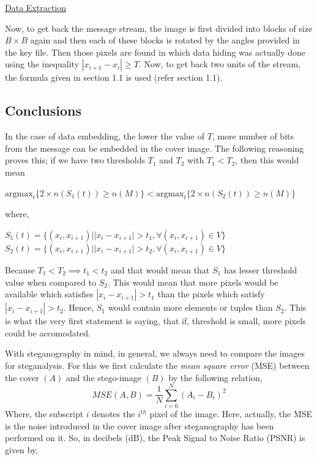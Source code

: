 \documentclass{report}
\begin{document}
\underline{\large Data Extraction} \\
\par Now, to get back the message stream, the image is first divided into blocks of size $B \times B$ again and then each of these blocks is rotated by the angles provided in the key file. Then those pixels are found in which data hiding was actually done using the inequality $|x_{i+1}-x_{i}|\geq T$. Now, to get back two units of the stream, the formula given in section 1.1 is used (refer section 1.1).

\subsection{Conclusions}
In the case of data embedding, the lower the value of $T$, more number of bits from the message can be embedded in the cover image. The following reasoning proves this; if we have two thresholds $T_{1}$ and $T_{2}$ with $T_{1} < T_{2}$, then this would mean 
\begin{center}
$\textrm{argmax}_{t}\{2 \times n(S_{1}(t)) \geq n(M)\} < \textrm{argmax}_{t}\{2 \times n(S_{2}(t)) \geq n(M)\}$
\end{center}
where,
\begin{center}
$ S_{1}(t) = \{ (x_{i}, x_{i+1})||x_{i} - x_{i+1}| > t_{1}, \forall (x_{i}, x_{i+1}) \in V\} $ \\
$ S_{2}(t) = \{ (x_{i}, x_{i+1})||x_{i} - x_{i+1}| > t_{2}, \forall (x_{i}, x_{i+1}) \in V\} $
\end{center} 
Because $T_{1} < T_{2} \implies t_{1} < t_{2}$ and that would mean that $S_{1}$ has lesser threshold value when compared to $S_{2}$. This would mean that more pixels would be available which satisfies $|x_{i} - x_{i+1}| > t_{1}$ than the pixels which satisfy $|x_{i} - x_{i+1}| > t_{2}$. Hence, $S_{1}$ would contain more elements or tuples than $S_{2}$. This is what the very first statement is saying, that if, threshold is small, more pixels could be accomodated. \par With steganography in mind, in general, we always need to compare the images for steganalysis. For this we first calculate the {\it mean square error} (MSE) between the cover $(A)$ and the stego-image $(B)$ by the following relation,
\begin{equation}
MSE(A, B) = \frac{1}{N} \sum_{i=0}^{N} (A_{i} - B_{i})^{2}
\end{equation}
Where, the subscript $i$ denotes the $i^{th}$ pixel of the image.
Here, actually, the MSE is the noise introduced in the cover image after steganography has been performed on it. So, in decibels (dB), the Peak Signal to Noise Ratio (PSNR) is given by,
\end{document}

